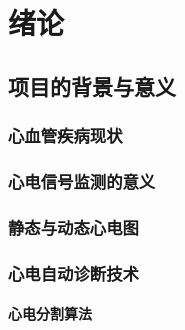 \documentclass{ecnuthesis}
\begin{document}
    \frontmatter

    \begin{abstract}
    \end{abstract}

    \begin{abstractEN}
    \end{abstractEN}

    \mainmatter


    \chapter{绪论}\label{ch:intro}


    \section{项目的背景与意义}\label{sec:background}

    \subsection{心血管疾病现状}\label{subsec:disease}

    \subsection{心电信号监测的意义}\label{subsec:significance}

    \subsection{静态与动态心电图}\label{subsec:static-dynamic}

    \subsection{心电自动诊断技术}\label{subsec:diagnosis}

    \subsubsection{心电分割算法}\label{subsubsec:segmentation}
\end{document}

